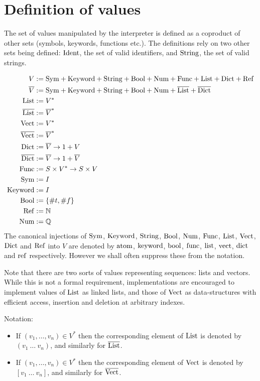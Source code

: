 \section{Definition of \rad{} values}
\label{value-definition}

The set of values manipulated by the \rad{} interpreter is defined as a coproduct
of other sets (symbols, keywords, functions etc.). The definitions rely on two
other sets being defined: $\mathrm{Ident}$, the set of valid identifiers, and $\mathrm{String}$,
the set of valid strings. 

\begin{align*}
  V &:= \mathrm{Sym} + \mathrm{Keyword} + \mathrm{String} + \mathrm{Bool} + \mathrm{Num} + \mathrm{Func} + \mathrm{List} + \mathrm{Dict} + \mathrm{Ref}\\
  \overline{V} &:= \mathrm{Sym} + \mathrm{Keyword} + \mathrm{String} + \mathrm{Bool} + \mathrm{Num} + \overline{\mathrm{List}} + \overline{\mathrm{Dict}}\\
  \mathrm{List} &:= V^*\\
  \overline{\mathrm{List}} &:= \overline{V}^*\\
  \mathrm{Vect} &:= V^*\\
  \overline{\mathrm{Vect}} &:= \overline{V}^*\\
  \mathrm{Dict} &:= \overline{V} \to 1 + V\\
  \overline{\mathrm{Dict}} &:= \overline{V} \to 1 + \overline{V}\\
  \mathrm{Func} &:= S \times V^* \to S \times V\\
  \mathrm{Sym} &:= I\\
  \mathrm{Keyword} &:= I\\
  \mathrm{Bool} &:= \{\#t, \#f\}\\
  \mathrm{Ref} &:= \mathbb{N}\\
  \mathrm{Num} &:= \mathbb{Q}
\end{align*}
The canonical injections of $\mathrm{Sym}$, $\mathrm{Keyword}$, $\mathrm{String}$, $\mathrm{Bool}$, $\mathrm{Num}$,
$\mathrm{Func}$, $\mathrm{List}$, $\mathrm{Vect}$, $\mathrm{Dict}$ and $\mathrm{Ref}$ into $V$ are denoted by $\mathrm{atom}$,
$\mathrm{keyword}$, $\mathrm{bool}$, $\mathrm{func}$, $\mathrm{list}$, $\mathrm{vect}$, $\mathrm{dict}$ and $\mathrm{ref}$ respectively.
However we shall often suppress these from the notation.

Note that there are two sorts of values representing sequences: lists and
vectors. While this is not a formal requirement, implementations are encouraged
to implement values of $\mathrm{List}$ as linked lists, and those of $\mathrm{Vect}$ as
data-structures with efficient access, insertion and deletion at arbitrary
indexes.

Notation:
\begin{itemize}
  \item If $(v_1, \ldots, v_n) \in V^*$ then the corresponding element of
    $\mathrm{List}$ is denoted by $(v_1 \ \ldots \ v_n)$, and similarly for
    $\overline{\mathrm{List}}$.
  \item If $(v_1, \ldots, v_n) \in V^*$ then the corresponding element of
    $\mathrm{Vect}$ is denoted by $[v_1 \ \ldots \ v_n]$, and similarly for $\overline{\mathrm{Vect}}$.
\end{itemize}